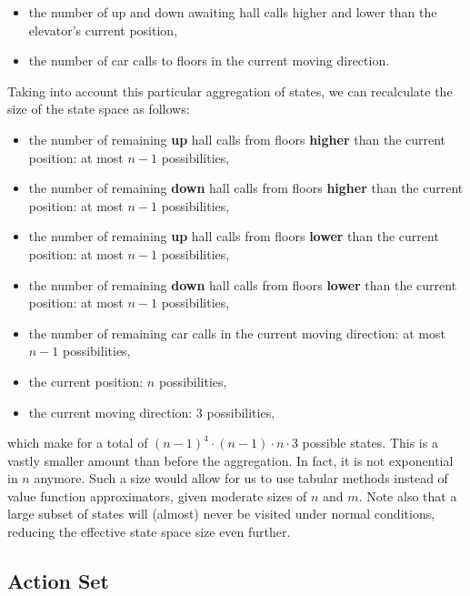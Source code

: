 \begin{itemize}
    \item the number of up and down awaiting hall calls higher and lower than the elevator's current position,

    \item the number of car calls to floors in the current moving direction.
\end{itemize}

Taking into account this particular aggregation of states, we can recalculate the size of the state space as follows:

\begin{itemize}
    \item the number of remaining \textbf{up} hall calls from floors \textbf{higher} than the current position: at most $n - 1$ possibilities,
    \item the number of remaining \textbf{down} hall calls from floors \textbf{higher} than the current position: at most $n - 1$ possibilities,
    \item the number of remaining \textbf{up} hall calls from floors \textbf{lower} than the current position: at most $n - 1$ possibilities,
    \item the number of remaining \textbf{down} hall calls from floors \textbf{lower} than the current position: at most $n - 1$ possibilities,
    \item the number of remaining car calls in the current moving direction: at most $n - 1$ possibilities,
    \item the current position: $n$ possibilities,
    \item the current moving direction: 3 possibilities,
\end{itemize}

which make for a total of $(n-1)^4 \cdot (n - 1) \cdot n \cdot 3$ possible states. This is a vastly smaller amount than before the aggregation. In fact, it is not exponential in $n$ anymore. Such a size would allow for us to use tabular methods instead of value function approximators, given moderate sizes of $n$ and $m$. Note also that a large subset of states will (almost) never be visited under normal conditions, reducing the effective state space size even further.


\subsection{Action Set}

